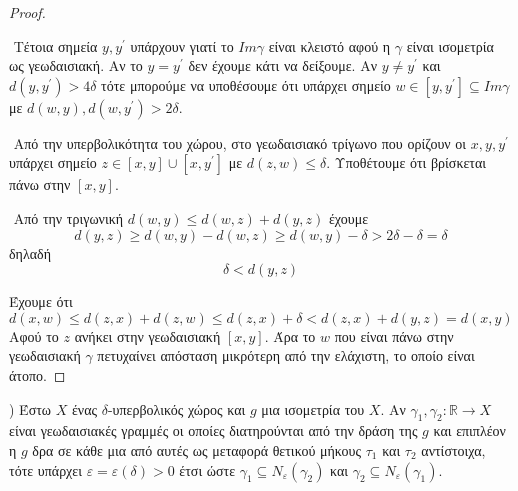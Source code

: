\documentclass[oneside,a4paper]{article}
\begin{document}
\begin{proof} $ $

	$ $\newline
	Τέτοια σημεία $y,y^{\prime}$ υπάρχουν γιατί το $Im\gamma$ είναι κλειστό αφού η $\gamma$ είναι ισομετρία ως γεωδαισιακή. Αν το $y=y^{\prime}$ δεν έχουμε κάτι να δείξουμε. Αν $y\neq y^{\prime}$ και $d(y,y^{\prime}) > 4\delta$ τότε μπορούμε να υποθέσουμε ότι υπάρχει σημείο $w \in [y,y^{\prime}] \subseteq Im\gamma$ με $d(w,y),d(w,y^{\prime}) > 2\delta$.

	$ $\newline
	Από την υπερβολικότητα του χώρου, στο γεωδαισιακό τρίγωνο που ορίζουν οι $x,y,y^{\prime}$ υπάρχει σημείο $z \in [x,y]\cup[x,y^{\prime}]$ με $d(z,w) \leq \delta$. Υποθέτουμε ότι βρίσκεται πάνω στην $[x,y]$.

	$ $\newline
	Από την τριγωνική $d(w,y) \leq d(w,z) + d(y,z)$ έχουμε $$d(y,z) \geq d(w,y) - d(w,z) \geq d(w,y) - \delta > 2\delta - \delta = \delta$$ δηλαδή
	$$ \delta  < d(y,z) $$
	
	\noindent Έχουμε ότι 
	$$d(x,w) \leq d(z,x) + d(z,w) \leq d(z,x) + \delta < d(z,x) + d(y,z) = d(x,y)$$ Αφού το $z$ ανήκει στην γεωδαισιακή $[x,y]$. Άρα το $w$ που είναι πάνω στην γεωδαισιακή $\gamma$ πετυχαίνει απόσταση μικρότερη από την ελάχιστη, το οποίο είναι άτοπο.


\end{proof}








\pagebreak

) Έστω $X$ ένας $\delta$-υπερβολικός χώρος και $g$ μια ισομετρία του $X$. Αν $\gamma_1,\gamma_2: \mathbb R\rightarrow X$ είναι γεωδαισιακές γραμμές οι οποίες διατηρούνται από την δράση της $g$ και επιπλέον η $g$ δρα σε κάθε μια από αυτές ως μεταφορά θετικού μήκους $\tau_1$ και $\tau_2$ αντίστοιχα, τότε υπάρχει $\varepsilon = \varepsilon(\delta) >0$ έτσι ώστε $\gamma_1 \subseteq N_{\varepsilon}(\gamma_2)$ και $\gamma_2 \subseteq N_{\varepsilon} (\gamma_1)$.
\end{document}
